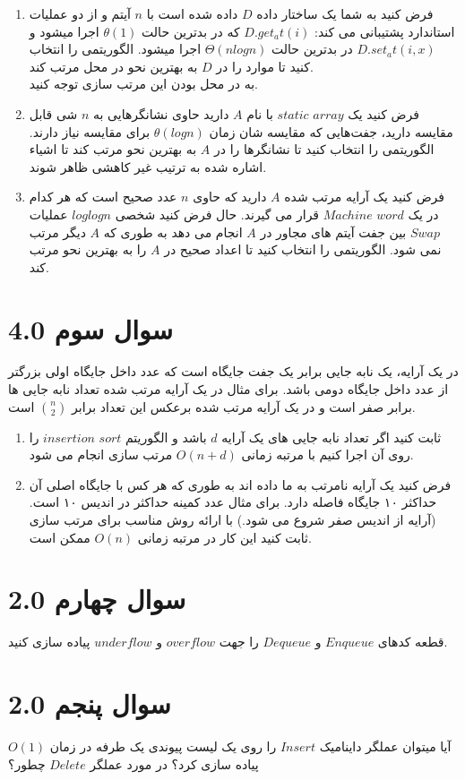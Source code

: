 \documentclass[12pt]{article}
\begin{document}
\begin{enumerate}[label=\alph*)]
    \item فرض کنید به شما یک ساختار داده $D$ داده شده است با $n$ آیتم و از دو عملیات استاندارد پشتیبانی می کند: $D.get_at(i)$ که در بدترین حالت $\theta(1)$  اجرا میشود و $D.set_at(i, x)$ در بدترین حالت $\Theta(n log n)$  اجرا میشود. الگوریتمی را انتخاب کنید تا موارد را در $D$ به بهترین نحو در محل مرتب کند.
    \\
    به در محل بودن این مرتب سازی توجه کنید.
    \item فرض کنید یک $array$ $static$ با نام $A$ دارید حاوی نشانگرهایی به $n$ شی قابل مقایسه دارید، جفت‌هایی که مقایسه شان زمان $\theta(log n)$ برای مقایسه نیاز دارند. الگوریتمی را انتخاب کنید تا نشانگرها را در $A$ به بهترین نحو مرتب کند تا اشیاء اشاره شده به ترتیب غیر کاهشی ظاهر شوند.
    \item فرض کنید یک آرایه مرتب شده $A$ دارید که حاوی $n$ عدد صحیح است که هر کدام در یک $word$ $Machine$ قرار می گیرند. حال فرض کنید شخصی $log log n$ عملیات $Swap$ بین جفت آیتم های مجاور در $A$ انجام می دهد به طوری که $A$ دیگر مرتب نمی شود. الگوریتمی را انتخاب کنید تا اعداد صحیح در $A$ را به بهترین نحو مرتب کند.
\end{enumerate}


\section{سوال سوم 4.0}
در یک آرایه، یک نابه جایی برابر یک جفت جایگاه است که عدد داخل جایگاه اولی بزرگتر از عدد داخل جایگاه دومی باشد. برای مثال در یک آرایه مرتب شده تعداد نابه جایی ها برابر صفر است و در یک آرایه مرتب شده برعکس این تعداد برابر $\binom{n}{2}$ است.


\begin{enumerate}[label=\alph*)]
    \item  ثابت کنید اگر تعداد نابه جایی های یک آرایه $d$ باشد و الگوریتم $sort$ $insertion$ را روی آن اجرا کنیم با مرتبه زمانی $O(n+d)$ مرتب سازی انجام می شود.
    \item فرض کنید یک آرایه نامرتب به ما داده اند به طوری که هر کس با جایگاه اصلی آن حداکثر ۱۰ جایگاه فاصله دارد.
    برای مثال عدد کمینه حداکثر در اندیس ۱۰ است. (آرایه از اندیس صفر شروع می شود.) با ارائه روش مناسب برای مرتب سازی ثابت کنید این کار در مرتبه زمانی $O(n)$ ممکن است.
\end{enumerate}



\section{سوال چهارم 2.0}
قطعه کدهای $Enqueue$ و $Dequeue$ را جهت $overflow$ و $underflow$ پیاده سازی کنید.

\section{سوال پنجم 2.0}
آیا میتوان عملگر داینامیک $Insert$ را روی یک لیست پیوندی یک طرفه در زمان $O(1)$ پیاده سازی کرد؟ در مورد عملگر $Delete$ چطور؟
\end{document}
